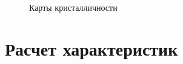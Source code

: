 \begin{figure}[ht]
\begin{tabular}{cc}
\end{tabular}
\caption{Карты кристалличности}
\end{figure}
	
	
	
	
\section{Расчет характеристик}
